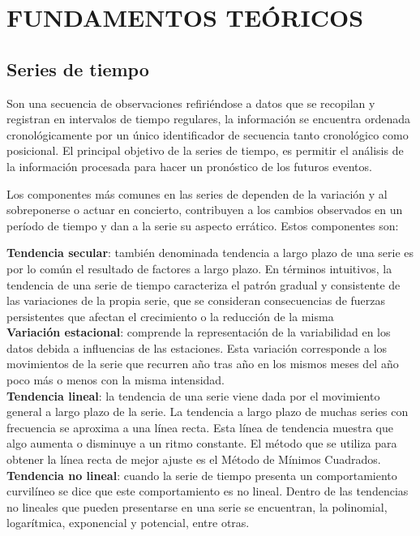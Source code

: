 \chapter{FUNDAMENTOS TEÓRICOS}

\section{Series de tiempo}

Son una secuencia de observaciones refiriéndose a datos que se recopilan y registran en intervalos de tiempo regulares, 
la información se encuentra ordenada cronológicamente por un único identificador de secuencia tanto cronológico como posicional. 
El principal objetivo de la series de tiempo, es permitir el análisis de la información procesada para hacer un  pronóstico 
de los futuros eventos.

Los componentes más comunes en las series de dependen de  la variación y al sobreponerse o actuar en concierto, contribuyen a 
los cambios observados en un período de tiempo y dan a la serie su aspecto errático. Estos componentes son: 

\textbf{Tendencia secular}:
también denominada tendencia a largo plazo de una serie es por lo común el resultado de factores a largo plazo. 
En términos intuitivos, la tendencia de una serie de tiempo caracteriza el patrón gradual y consistente de las variaciones de la propia serie, que se consideran consecuencias de fuerzas persistentes que afectan el crecimiento o la reducción de la misma
\\
\textbf{Variación estacional}:
comprende la representación de la variabilidad en los datos debida a influencias de las estaciones. Esta variación corresponde a los movimientos de la serie que recurren año tras año en los mismos meses del año poco más o menos con la misma intensidad.
\\
\textbf{Tendencia lineal}: la tendencia de una serie viene dada por el movimiento general a largo plazo de la serie. La tendencia a 
largo plazo de muchas series con frecuencia se aproxima a una línea recta. Esta línea de tendencia muestra que algo aumenta o 
disminuye a un ritmo constante. El método que se utiliza para obtener la línea recta de mejor ajuste es el Método de Mínimos Cuadrados. 
\\
\textbf{Tendencia no lineal}: cuando la serie de tiempo presenta un comportamiento curvilíneo se dice que este comportamiento es no lineal. 
Dentro de las tendencias no lineales que pueden presentarse en una serie se encuentran, la polinomial, logarítmica, exponencial y potencial, entre otras.



